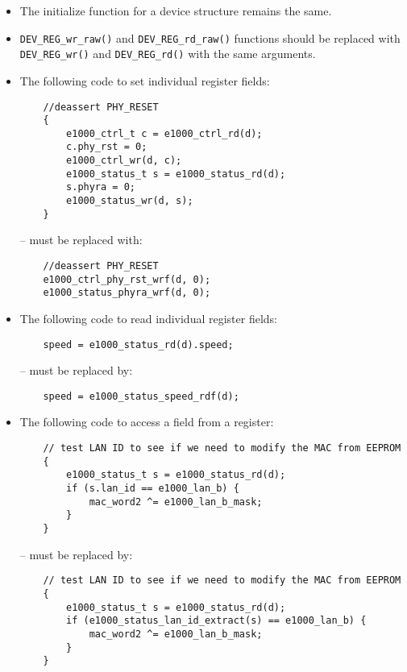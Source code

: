 \documentclass[a4paper,11pt,twoside]{report}
\begin{document}
\begin{itemize}

\item The initialize function for a device structure remains the same. 

\item \texttt{DEV\_REG\_wr\_raw()} and \texttt{DEV\_REG\_rd\_raw()}
  functions should be replaced with \texttt{DEV\_REG\_wr()} and
  \texttt{DEV\_REG\_rd()} with the same arguments.  

\item The following code to set individual register fields:

\begin{verbatim}
    //deassert PHY_RESET
    {
        e1000_ctrl_t c = e1000_ctrl_rd(d);
        c.phy_rst = 0;
        e1000_ctrl_wr(d, c);
        e1000_status_t s = e1000_status_rd(d);
        s.phyra = 0;
        e1000_status_wr(d, s);
    }
\end{verbatim}

 -- must be replaced with:

\begin{verbatim}
    //deassert PHY_RESET
    e1000_ctrl_phy_rst_wrf(d, 0);
    e1000_status_phyra_wrf(d, 0);
\end{verbatim}

\item The following code to read individual register fields:

\begin{verbatim}
    speed = e1000_status_rd(d).speed;
\end{verbatim}

 -- must be replaced by: 

\begin{verbatim}
    speed = e1000_status_speed_rdf(d);
\end{verbatim}

\item The following code to access a field from a register:

\begin{verbatim}
    // test LAN ID to see if we need to modify the MAC from EEPROM
    {
        e1000_status_t s = e1000_status_rd(d);
        if (s.lan_id == e1000_lan_b) {
            mac_word2 ^= e1000_lan_b_mask;
        }
    }
\end{verbatim}

  -- must be replaced by:

\begin{verbatim}
    // test LAN ID to see if we need to modify the MAC from EEPROM
    {
        e1000_status_t s = e1000_status_rd(d);
        if (e1000_status_lan_id_extract(s) == e1000_lan_b) {
            mac_word2 ^= e1000_lan_b_mask;
        }
    }
\end{verbatim}


\end{itemize}
\end{document}
